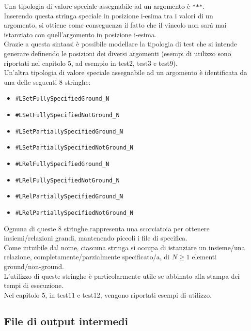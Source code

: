 Una tipologia di valore speciale assegnabile ad un argomento è \texttt{***}.\\
Inserendo questa stringa speciale in posizione i-esima tra i valori di un argomento, si ottiene come conseguenza il fatto che il vincolo non sarà mai istanziato con quell'argomento in posizione i-esima.\\

Grazie a questa sintassi è possibile modellare la tipologia di test che si intende generare definendo le posizioni dei diversi argomenti (esempi di utilizzo sono riportati nel capitolo 5, ad esempio in test2, test3 e test9).\\

Un'altra tipologia di valore speciale assegnabile ad un argomento è identificata da una delle seguenti 8 stringhe:\\
\begin{itemize}
\item \texttt{\#LSetFullySpecifiedGround\_N}
\item \texttt{\#LSetFullySpecifiedNotGround\_N}
\item \texttt{\#LSetPartiallySpecifiedGround\_N}
\item \texttt{\#LSetPartiallySpecifiedNotGround\_N}
\item \texttt{\#LRelFullySpecifiedGround\_N}
\item \texttt{\#LRelFullySpecifiedNotGround\_N}
\item \texttt{\#LRelPartiallySpecifiedGround\_N}
\item \texttt{\#LRelPartiallySpecifiedNotGround\_N}
\end{itemize}

Ognuna di queste 8 stringhe rappresenta una scorciatoia per ottenere insiemi/relazioni grandi, mantenendo piccoli i file di specifica.\\
Come intuibile dal nome, ciascuna stringa si occupa di istanziare un insieme/una relazione, completamente/parzialmente specificato/a, di $N \geq 1$ elementi ground/non-ground.\\
L'utilizzo di queste stringhe è particolarmente utile se abbinato alla stampa dei tempi di esecuzione.\\
Nel capitolo 5, in test11 e test12, vengono riportati esempi di utilizzo.\\

\subsection{File di output intermedi}
